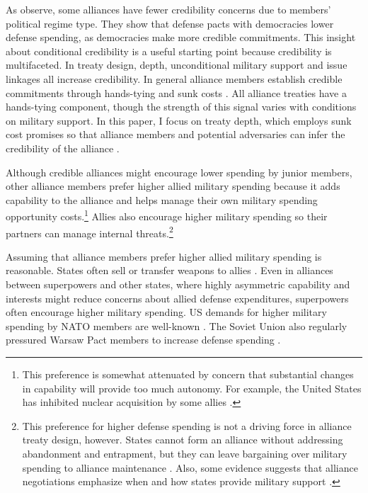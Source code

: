 \documentclass[12pt]{article}
\begin{document}
As \citet{DigiuseppePoast2016} observe, some alliances have fewer credibility concerns due to members' political regime type.
They show that defense pacts with democracies lower defense spending, as democracies make more credible commitments.
This insight about conditional credibility is a useful starting point because credibility is multifaceted. 
In treaty design, depth, unconditional military support \citep{Benson2012, Chibaetal2015} and issue linkages \citep{LongLeeds2006, Poast2012, Poast2013} all increase credibility.
In general alliance members establish credible commitments through hands-tying and sunk costs \citep{Fearon1997}. 
All alliance treaties have a hands-tying component, though the strength of this signal varies with conditions on military support. 
In this paper, I focus on treaty depth, which employs sunk cost promises so that alliance members and potential adversaries can infer the credibility of the alliance \citep{Leeds2003, FuhrmannSechser2014}. 


Although credible alliances might encourage lower spending by junior members, other alliance members prefer higher allied military spending because it adds capability to the alliance and helps manage their own military spending opportunity costs.\footnote{This preference is somewhat attenuated by concern that substantial changes in capability will provide too much autonomy. For example, the United States has inhibited nuclear acquisition by some allies \citep{Gavin2015, Lanoszka2015}.}
Allies also encourage higher military spending so their partners can manage internal threats.\footnote{
This preference for higher defense spending is not a driving force in alliance treaty design, however.
States cannot form an alliance without addressing abandonment and entrapment, but they can leave bargaining over military spending to alliance maintenance \citep{Snyder1997}.
Also, some evidence suggests that alliance negotiations emphasize when and how states provide military support \citep{Poast2019a}.} 


Assuming that alliance members prefer higher allied military spending is reasonable. 
States often sell or transfer weapons to allies \citep{Yarhi-Miloetal2016, Pampetal2018}. 
Even in alliances between superpowers and other states, where highly asymmetric capability and interests might reduce concerns about allied defense expenditures, superpowers often encourage higher military spending. 
US demands for higher military spending by NATO members are well-known \citep{SchuesslerShifrinson2019}.
The Soviet Union also regularly pressured Warsaw Pact members to increase defense spending \citep{Simon1985}. 
\end{document}
